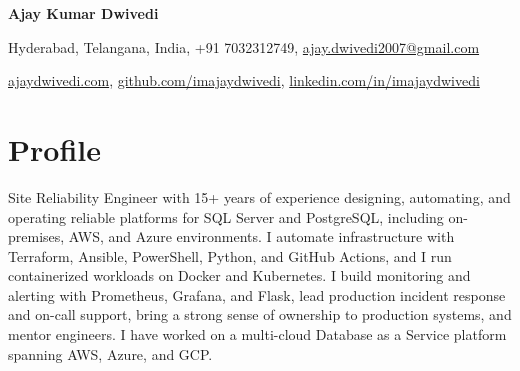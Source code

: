 \documentclass[10pt,a4paper]{article}
\begin{document}
\begin{center}
{\Huge\bfseries Ajay Kumar Dwivedi}

\vspace{6pt}
Hyderabad, Telangana, India, +91 7032312749, \href{mailto:ajay.dwivedi2007@gmail.com}{ajay.dwivedi2007@gmail.com}

\vspace{2pt}
\href{https://ajaydwivedi.com/}{ajaydwivedi.com}, \href{https://github.com/imajaydwivedi}{github.com/imajaydwivedi}, \href{https://linkedin.com/in/imajaydwivedi/}{linkedin.com/in/imajaydwivedi}
\end{center}

\section{Profile}
Site Reliability Engineer with 15+ years of experience designing, automating, and operating reliable platforms for SQL Server and PostgreSQL, including on-premises, AWS, and Azure environments. I automate infrastructure with Terraform, Ansible, PowerShell, Python, and GitHub Actions, and I run containerized workloads on Docker and Kubernetes. I build monitoring and alerting with Prometheus, Grafana, and Flask, lead production incident response and on-call support, bring a strong sense of ownership to production systems, and mentor engineers. I have worked on a multi-cloud Database as a Service platform spanning AWS, Azure, and GCP.
\end{document}
